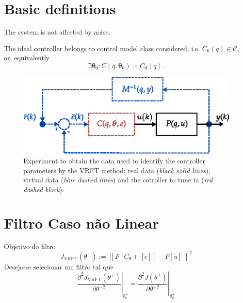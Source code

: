 \section{Basic definitions}\label{sec:vrft_basic_def}

\begin{defn}\label{def:idealControler}
\end{defn}

\begin{assum}\label{ass:noiseFree} 
   The system is not affected by noise.
\end{assum}

\begin{assum}\label{ass:machedControl} %
   The ideal controller belongs to control model class considered, i.e. $C_0(q) \in \mathscr{C}$, or, equivalently
   \begin{equation}
      \exists \bm{\theta}_0 : C(q,\bm{\theta}_0)=C_0(q)
      \label{eq:assumpMatched}.
   \end{equation}
\end{assum}

\begin{figure}[H]
   \centering
   \includegraphics{Figs/diagrama_VRFT.eps}
   \caption{ Experiment to obtain the data used to identify the controller parameters by the VRFT method:
   real data (\textit{black solid lines}), virtual data (\textit{blue dashed lines}) and the cotroller to tune in (\textit{red dashed block}).}
   \label{fig:Figs-diagrama_VRFT-eps}
\end{figure}

\section{Filtro Caso não Linear}%
\label{sec:filtro_caso_não_linear}

Objetivo do filtro
\begin{equation}
   J_{\mathrm{VRFT}}\left(\theta^{+}\right):=\left\|F\left[C_{\theta}+[\tilde{e}]\right]-F[\tilde{u}]\right\|^{2}
   \label{eq:JVR}
\end{equation}
Deseja-se selecionar um filtro tal que \begin{equation}
   \left.\frac{\partial^{2} J_{\mathrm{VRFT}}\left(\theta^{+}\right)}{\partial \theta^{+2}}\right|_{\theta_{0}^{+}}=\left.\frac{\partial^{2} J\left(\theta^{+}\right)}{\partial \theta^{+2}}\right|_{\theta_{0}^{+}}
   \label{eq:condToF}
\end{equation}

